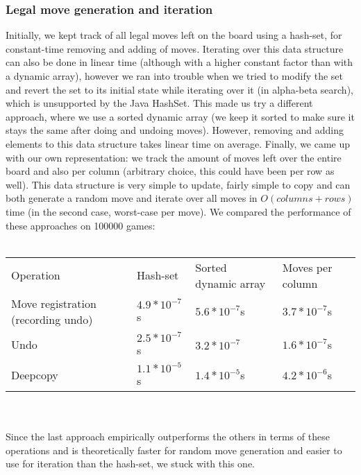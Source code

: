 \subsubsection{Legal move generation and iteration}

Initially, we kept track of all legal moves left on the board using a hash-set, for constant-time removing and adding of moves. Iterating over this data structure can also be done in linear time (although with a higher constant factor than with a dynamic array), however we ran into trouble when we tried to modify the set and revert the set to its initial state while iterating over it (in alpha-beta search), which is unsupported by the Java HashSet. This made us try a different approach, where we use a sorted dynamic array (we keep it sorted to make sure it stays the same after doing and undoing moves). However, removing and adding elements to this data structure takes linear time on average. Finally, we came up with our own representation: we track the amount of moves left over the entire board and also per column (arbitrary choice, this could have been per row as well). This data structure is very simple to update, fairly simple to copy and can both generate a random move and iterate over all moves in $O(columns + rows)$ time (in the second case, worst-case per move). We compared the performance of these approaches on 100000 games:\\
\\
\begin{tabular}{l|l|l|l}
Operation                          & Hash-set & Sorted dynamic array & Moves per column \\ \cline{1-4}
Move registration (recording undo) & $4.9*10^{-7}$s         & $5.6*10^{-7}$s                     & $3.7*10^{-7}$s                 \\ \cline{1-4}
Undo                               & $2.5*10^{-7}$s         & $3.2*10^{-7}$                     & $1.6*10^{-7}$s                 \\ \cline{1-4}
Deepcopy                           & $1.1*10^{-5}$s         & $1.4*10^{-5}$s                     & $4.2*10^{-6}$s                 \\
\end{tabular}\\
\\
Since the last approach empirically outperforms the others in terms of these operations and is theoretically faster for random move generation and easier to use for iteration than the hash-set, we stuck with this one.

